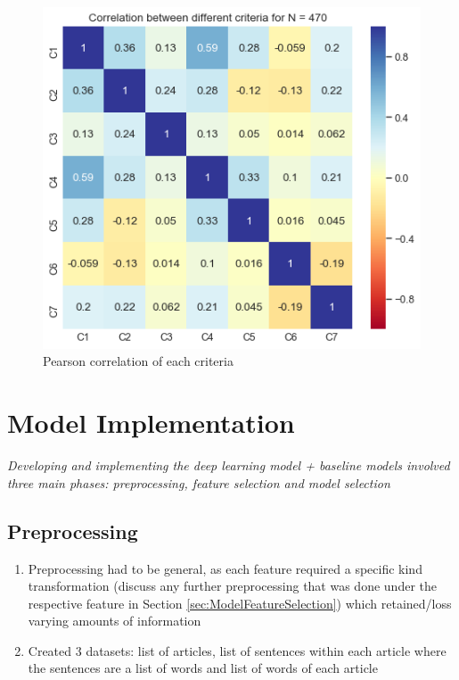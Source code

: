 \documentclass[a4paper,twoside,phd]{BYUPhys}
\begin{document}
\begin{figure}[!htb]
	\centering
	\includegraphics[totalheight=8cm]{images/criteria-correlation.png}
	\caption{Pearson correlation of each criteria}
	\label{fig:CriteriaCorrelation}
\end{figure}



\section{Model Implementation}
\label{sec:SystemModel}

\textit{Developing and implementing the deep learning model + baseline models involved three main phases: preprocessing, feature selection and model selection}

\subsection{Preprocessing}
\label{sec:ModelPreprocessing}

\begin{enumerate}
	\item Preprocessing had to be general, as each feature required a specific kind transformation (discuss any further preprocessing that was done under the respective feature in Section \ref{sec:ModelFeatureSelection}) which retained/loss varying amounts of information
	\item Created 3 datasets: list of articles, list of sentences within each article where the sentences are a list of words and list of words of each article
\end{enumerate}
\end{document}

